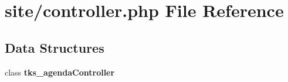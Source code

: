 \section{site/controller.php File Reference}
\label{site_2controller_8php}
\subsection*{Data Structures}
\begin{DoxyCompactItemize}
\item 
class \textbf{ tks\+\_\+agenda\+Controller}
\end{DoxyCompactItemize}
